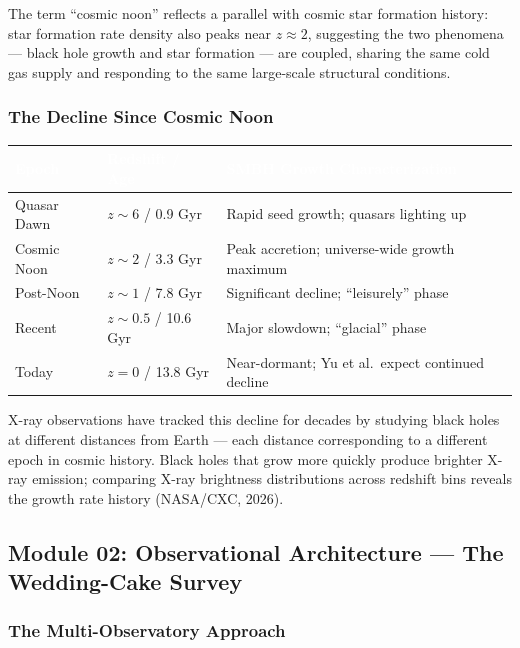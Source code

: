 \documentclass[11pt,letterpaper]{article}
\newcommand{\tableheader}[1]{\textbf{\sffamily\textcolor{white}{#1}}}
\begin{document}
The term ``cosmic noon'' reflects a parallel with cosmic star formation history: star formation rate density also peaks near $z \approx 2$, suggesting the two phenomena --- black hole growth and star formation --- are coupled, sharing the same cold gas supply and responding to the same large-scale structural conditions.

\subsubsection{The Decline Since Cosmic Noon}

\begin{center}
\begin{tabularx}{\textwidth}{C{2.5cm}L{4cm}X}
\toprule
{}
\tableheader{Epoch} & \tableheader{Redshift / Age} & \tableheader{SMBH Growth Characterization} \\
\midrule
Quasar Dawn & $z \sim 6$ / 0.9 Gyr & Rapid seed growth; quasars lighting up \\
Cosmic Noon & $z \sim 2$ / 3.3 Gyr & Peak accretion; universe-wide growth maximum \\
Post-Noon & $z \sim 1$ / 7.8 Gyr & Significant decline; ``leisurely'' phase \\
Recent & $z \sim 0.5$ / 10.6 Gyr & Major slowdown; ``glacial'' phase \\
Today & $z = 0$ / 13.8 Gyr & Near-dormant; Yu et al.\ expect continued decline \\
\bottomrule
\end{tabularx}
\end{center}

X-ray observations have tracked this decline for decades by studying black holes at different distances from Earth --- each distance corresponding to a different epoch in cosmic history. Black holes that grow more quickly produce brighter X-ray emission; comparing X-ray brightness distributions across redshift bins reveals the growth rate history (NASA/CXC, 2026).

\subsection{Module 02: Observational Architecture --- The Wedding-Cake Survey}

\subsubsection{The Multi-Observatory Approach}
\end{document}
